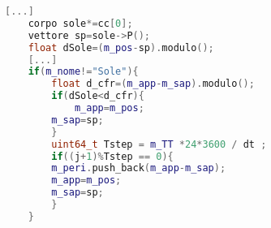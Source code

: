 \begin{lstlisting}[language=C++]
    [...]
    corpo sole*=cc[0];
    vettore sp=sole->P();
    float dSole=(m_pos-sp).modulo();
    [...]
    if(m_nome!="Sole"){
        float d_cfr=(m_app-m_sap).modulo();
        if(dSole<d_cfr){
            m_app=m_pos;
    	m_sap=sp;
        }
        uint64_t Tstep = m_TT *24*3600 / dt ;
        if((j+1)%Tstep == 0){
    	m_peri.push_back(m_app-m_sap);
    	m_app=m_pos;
    	m_sap=sp;
        }
    }
\end{lstlisting}